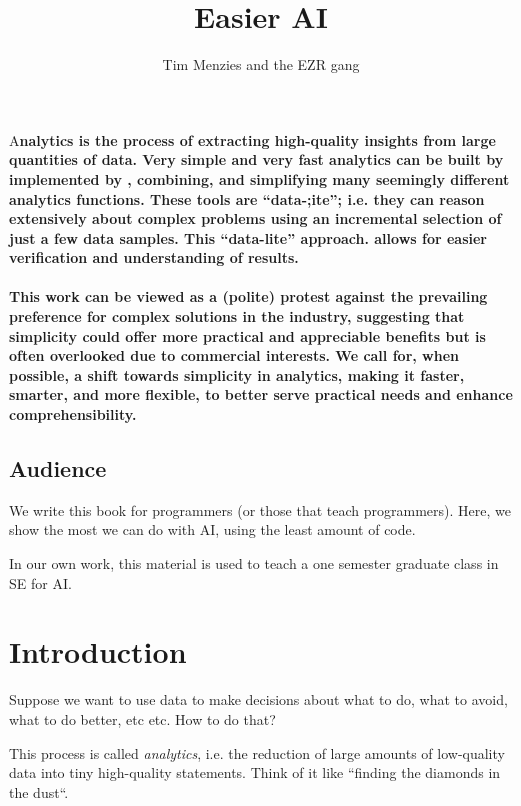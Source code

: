 \documentclass[landscape,	DIV=calc,%
							paper=letter,%
							fontsize=10pt,%
							twocolumn]{scrartcl}	 					%
\title{Easier AI }					%
\author{Tim Menzies and the EZR gang }											%
\date{}
\newcommand{\initial}[1]{%
     \lettrine[lines=3,lhang=0.3,nindent=0em]{
     				\color{DarkGoldenrod}
     				{\textsf{#1}}}{}}
\begin{document}
\maketitle
\vspace{-20px}
\thispagestyle{fancy} 			%
\initial{A}\textbf{nalytics is the process of
extracting high-quality  insights from large quantities
of data. 
Very simple and very fast
analytics can  be built by implemented by , combining, and simplifying
many seemingly different analytics functions.
These tools are ``data-;ite''; i.e. they can reason extensively about
complex problems using an incremental selection of just a few data samples.
This ``data-lite'' approach.
allows for easier verification and understanding of results. \\~\\ 
This  work can be viewed as a (polite) protest
against  the prevailing preference for complex solutions
in the industry,  suggesting that simplicity could offer more
practical and appreciable benefits but is often overlooked due to
commercial interests. We call for, when possible,
a shift towards simplicity
in analytics, making it faster, smarter, and more flexible, to
better serve practical needs and enhance comprehensibility.}

\subsection*{Audience}
We write this book for programmers (or those that teach programmers).
Here, we show
the most we  can do with AI, using the least amount of code.

In our own work, this material is used to teach a one semester graduate
class in SE for AI.

\newpage
\tableofcontents


\clearpage \section{Introduction}

Suppose we want to use data to make decisions about what to do,
what to avoid, what to do better, etc etc. How to do that?

This process is called {\em analytics}, i.e. the reduction of large
amounts of low-quality data into tiny high-quality statements. Think of it like
``finding the diamonds in the dust``. 
\end{document}
